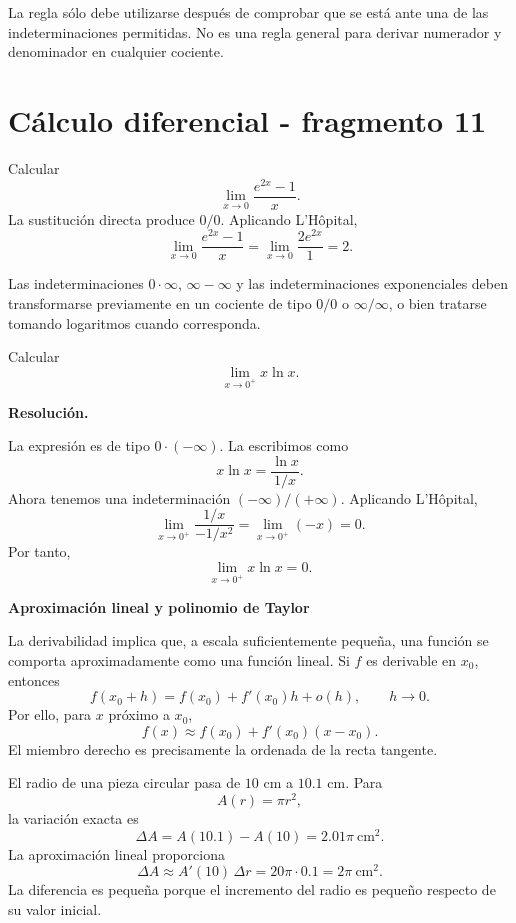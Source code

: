La regla sólo debe utilizarse después de comprobar que se está ante una de las indeterminaciones permitidas. No es una regla general para derivar numerador y denominador en cualquier cociente.


\section{Cálculo diferencial - fragmento 11}
\begin{example}
Calcular
\[
\lim_{x\to0}\frac{e^{2x}-1}{x}.
\]
La sustitución directa produce $0/0$. Aplicando L'Hôpital,
\[
\lim_{x\to0}\frac{e^{2x}-1}{x}
=
\lim_{x\to0}\frac{2e^{2x}}{1}
=2.
\]
\end{example}

Las indeterminaciones $0\cdot\infty$, $\infty-\infty$ y las indeterminaciones exponenciales deben transformarse previamente en un cociente de tipo $0/0$ o $\infty/\infty$, o bien tratarse tomando logaritmos cuando corresponda.

\begin{solvedexercise}
Calcular
\[
\lim_{x\to0^+}x\ln x.
\]

\textbf{Resolución.}\par\smallskip
La expresión es de tipo $0\cdot(-\infty)$. La escribimos como
\[
x\ln x=\frac{\ln x}{1/x}.
\]
Ahora tenemos una indeterminación $(-\infty)/(+\infty)$. Aplicando L'Hôpital,
\[
\lim_{x\to0^+}\frac{1/x}{-1/x^2}
=
\lim_{x\to0^+}(-x)=0.
\]
Por tanto,
\[
\boxed{\lim_{x\to0^+}x\ln x=0}.
\]
\end{solvedexercise}

\textbf{Aproximación lineal y polinomio de Taylor}

La derivabilidad implica que, a escala suficientemente pequeña, una función se comporta aproximadamente como una función lineal. Si $f$ es derivable en $x_0$, entonces
\[
f(x_0+h)=f(x_0)+f'(x_0)h+o(h),
\qquad h\to0.
\]
Por ello, para $x$ próximo a $x_0$,
\[
\boxed{
f(x)\approx f(x_0)+f'(x_0)(x-x_0)
}.
\]
El miembro derecho es precisamente la ordenada de la recta tangente.

\begin{example}
El radio de una pieza circular pasa de $10$ cm a $10.1$ cm. Para
\[
A(r)=\pi r^2,
\]
la variación exacta es
\[
\Delta A=A(10.1)-A(10)=2.01\pi\ \mathrm{cm}^2.
\]
La aproximación lineal proporciona
\[
\Delta A\approx A'(10)\,\Delta r
=20\pi\cdot0.1
=2\pi\ \mathrm{cm}^2.
\]
La diferencia es pequeña porque el incremento del radio es pequeño respecto de su valor inicial.
\end{example}

